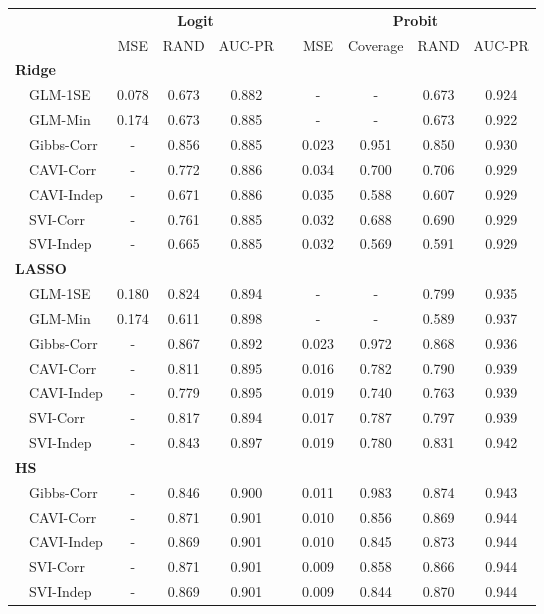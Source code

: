 \begin{center}
\begin{tabular}{lcccccccc}
\hline\hline
\multicolumn{1}{l}{\bfseries }&\multicolumn{3}{c}{\bfseries Logit}&\multicolumn{1}{c}{\bfseries }&\multicolumn{4}{c}{\bfseries Probit}\tabularnewline
\cline{2-4} \cline{6-9}
\multicolumn{1}{l}{}&\multicolumn{1}{c}{MSE}&\multicolumn{1}{c}{RAND}&\multicolumn{1}{c}{AUC-PR}&\multicolumn{1}{c}{}&\multicolumn{1}{c}{MSE}&\multicolumn{1}{c}{Coverage}&\multicolumn{1}{c}{RAND}&\multicolumn{1}{c}{AUC-PR}\tabularnewline
\hline
{\bfseries Ridge}&&&&&&&&\tabularnewline
~~GLM-1SE&0.078&0.673&0.882&&-&-&0.673&0.924\tabularnewline
~~GLM-Min&0.174&0.673&0.885&&-&-&0.673&0.922\tabularnewline
~~Gibbs-Corr&-&0.856&0.885&&0.023&0.951&0.850&0.930\tabularnewline
~~CAVI-Corr&-&0.772&0.886&&0.034&0.700&0.706&0.929\tabularnewline
~~CAVI-Indep&-&0.671&0.886&&0.035&0.588&0.607&0.929\tabularnewline
~~SVI-Corr&-&0.761&0.885&&0.032&0.688&0.690&0.929\tabularnewline
~~SVI-Indep&-&0.665&0.885&&0.032&0.569&0.591&0.929\tabularnewline
\hline
{\bfseries LASSO}&&&&&&&&\tabularnewline
~~GLM-1SE&0.180&0.824&0.894&&-&-&0.799&0.935\tabularnewline
~~GLM-Min&0.174&0.611&0.898&&-&-&0.589&0.937\tabularnewline
~~Gibbs-Corr&-&0.867&0.892&&0.023&0.972&0.868&0.936\tabularnewline
~~CAVI-Corr&-&0.811&0.895&&0.016&0.782&0.790&0.939\tabularnewline
~~CAVI-Indep&-&0.779&0.895&&0.019&0.740&0.763&0.939\tabularnewline
~~SVI-Corr&-&0.817&0.894&&0.017&0.787&0.797&0.939\tabularnewline
~~SVI-Indep&-&0.843&0.897&&0.019&0.780&0.831&0.942\tabularnewline
\hline
{\bfseries HS}&&&&&&&&\tabularnewline
~~Gibbs-Corr&-&0.846&0.900&&0.011&0.983&0.874&0.943\tabularnewline
~~CAVI-Corr&-&0.871&0.901&&0.010&0.856&0.869&0.944\tabularnewline
~~CAVI-Indep&-&0.869&0.901&&0.010&0.845&0.873&0.944\tabularnewline
~~SVI-Corr&-&0.871&0.901&&0.009&0.858&0.866&0.944\tabularnewline
~~SVI-Indep&-&0.869&0.901&&0.009&0.844&0.870&0.944\tabularnewline
\hline
\end{tabular}\end{center}
